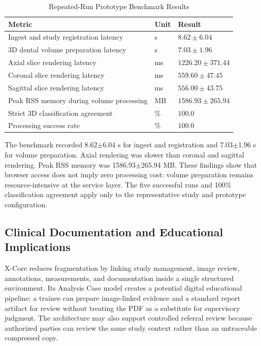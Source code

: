 \documentclass[journal]{IEEEtran}
\begin{document}
\begin{table}[!t]
\caption{Repeated-Run Prototype Benchmark Results}
\label{tab:benchmark}
\centering
\begin{tabular}{p{3.65cm}p{1.05cm}p{2.0cm}}
\toprule
\textbf{Metric} & \textbf{Unit} & \textbf{Result}\\
\midrule
Ingest and study registration latency & s & $8.62\pm6.04$\\
3D dental volume preparation latency & s & $7.03\pm1.96$\\
Axial slice rendering latency & ms & $1226.20\pm371.44$\\
Coronal slice rendering latency & ms & $559.60\pm47.45$\\
Sagittal slice rendering latency & ms & $556.00\pm43.75$\\
Peak RSS memory during volume processing & MB & $1586.93\pm265.94$\\
Strict 3D classification agreement & \% & $100.0$\\
Processing success rate & \% & $100.0$\\
\bottomrule
\end{tabular}
\end{table}

The benchmark recorded 8.62$\pm$6.04 s for ingest and registration and 7.03$\pm$1.96 s for volume preparation. Axial rendering was slower than coronal and sagittal rendering. Peak RSS memory was 1586.93$\pm$265.94 MB. These findings show that browser access does not imply zero processing cost: volume preparation remains resource-intensive at the service layer. The five successful runs and 100\% classification agreement apply only to the representative study and prototype configuration.

\subsection{Clinical Documentation and Educational Implications}

X-Core reduces fragmentation by linking study management, image review, annotations, measurements, and documentation inside a single structured environment. Its Analysis Case model creates a potential digital educational pipeline: a trainee can prepare image-linked evidence and a standard report artifact for review without treating the PDF as a substitute for supervisory judgment. The architecture may also support controlled referral review because authorized parties can review the same study context rather than an untraceable compressed copy.
\end{document}
